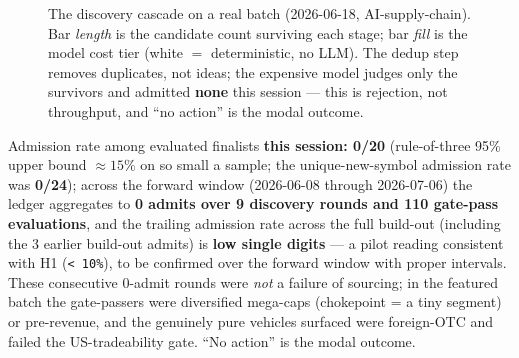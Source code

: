 \documentclass[11pt]{article}
\begin{document}
\begin{figure}[H]
\caption{The discovery cascade on a real batch (2026-06-18, AI-supply-chain). Bar
\emph{length} is the candidate count surviving each stage; bar \emph{fill} is the
model cost tier (white $=$ deterministic, no LLM). The dedup step removes
duplicates, not ideas; the expensive model judges only the survivors and admitted
\textbf{none} this session --- this is rejection, not throughput, and ``no action''
is the modal outcome.}
\label{fig:cascade}
\end{figure}

Admission rate among evaluated finalists \textbf{this session: 0/20}
(rule-of-three 95\% upper bound $\approx 15\%$ on so small a sample; the
unique-new-symbol admission rate was \textbf{0/24}); across the forward window
(2026-06-08 through 2026-07-06) the ledger aggregates to \textbf{0 admits over 9
discovery rounds and 110 gate-pass evaluations}, and the trailing admission rate
across the full build-out (including the 3 earlier build-out admits) is \textbf{low
single digits} --- a pilot reading consistent with H1 (\texttt{< 10\%}), to be
confirmed over the forward window with proper intervals.
These consecutive 0-admit rounds were \emph{not} a failure of sourcing; in the featured batch the
gate-passers were diversified mega-caps (chokepoint = a tiny segment) or
pre-revenue, and the genuinely pure vehicles surfaced were foreign-OTC and
failed the US-tradeability gate.
``No action'' is the modal outcome.
\end{document}

